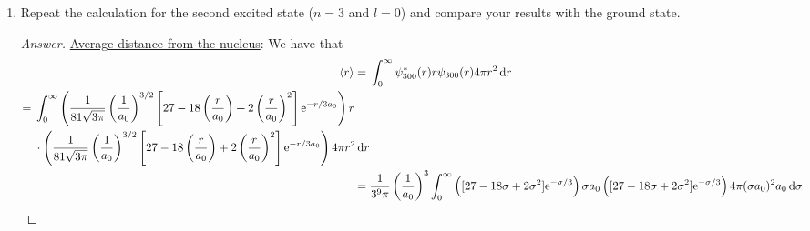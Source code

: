 \documentclass[../psets.tex]{subfiles}
\begin{document}
\begin{enumerate}
\begin{enumerate}
        \begin{proof}[Answer]
            We have from \textcite[211]{bib:McQuarrieSimon} that the probability that the electron is between $r$ and $r+\dd{r}$ is
            \begin{equation*}
                \Prob(r) = \frac{4}{a_0^3}r^2\e[-2r/a_0]
            \end{equation*}
            We want to find the point where $\dv*{\Prob(r)}{r}=0$, as this will be the maximum. Note that we know that $\Prob(r)$ takes on positive values, and we know that $\Prob(0)=\Prob(\infty)=0$, so we need not consider the boundary points. We can do this as follows.
            \begin{align*}
                0 &= \dv{r}\left( \frac{4}{a_0^3}r^2\e[-2r/a_0] \right)\\
                &= \frac{4}{a_0^3}\left( 2r\e[-2r/a_0]-\frac{2r^2}{a_0}\e[-2r/a_0] \right)\\
                &= \e[-2r/a_0]-\frac{r}{a_0}\e[-2r/a_0]\\
                \frac{r}{a_0} &= 1\\
                \Aboxed{r &= a_0}
            \end{align*}
        \end{proof}
        \item Repeat the calculation for the second excited state ($n=3$ and $l=0$) and compare your results with the ground state.
        \begin{proof}[Answer]
            \underline{Average distance from the nucleus}: We have that
            \begin{align*}
                \prb{r} ={}& \int_0^\infty\psi_{300}^*(r)r\psi_{300}(r)4\pi r^2\dd{r}\\
                \begin{split}
                    ={}& \int_0^\infty\left( \frac{1}{81\sqrt{3\pi}}\left( \frac{1}{a_0} \right)^{3/2}\left[ 27-18\left( \frac{r}{a_0} \right)+2\left( \frac{r}{a_0} \right)^2 \right]\e[-r/3a_0] \right)r\\
                    & \cdot\left( \frac{1}{81\sqrt{3\pi}}\left( \frac{1}{a_0} \right)^{3/2}\left[ 27-18\left( \frac{r}{a_0} \right)+2\left( \frac{r}{a_0} \right)^2 \right]\e[-r/3a_0] \right)4\pi r^2\dd{r}
                \end{split}\\
                ={}& \frac{1}{3^9\pi}\left( \frac{1}{a_0} \right)^3\int_0^\infty\left( [27-18\sigma+2\sigma^2]\e[-\sigma/3] \right)\sigma a_0\left( [27-18\sigma+2\sigma^2]\e[-\sigma/3] \right)4\pi(\sigma a_0)^2a_0\dd{\sigma}\\

\end{align*}
\end{proof}
\end{enumerate}
\end{enumerate}
\end{document}
